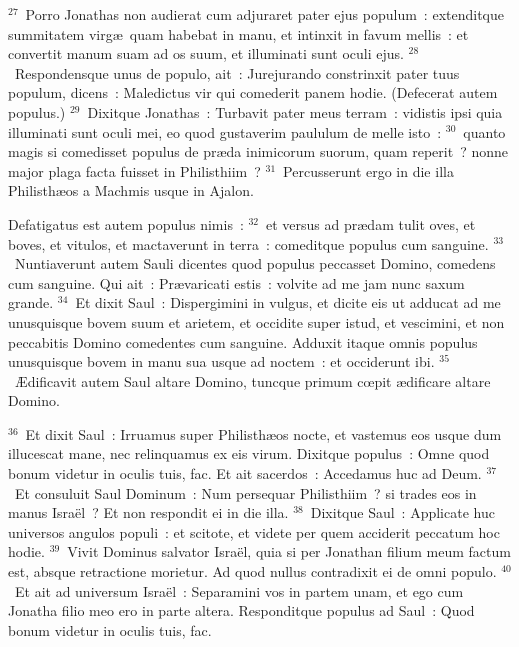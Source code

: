 ${}^{27}$~Porro Jonathas non audierat cum adjuraret pater ejus populum~: extenditque summitatem virg\ae\ quam habebat in manu, et intinxit in favum mellis~: et convertit manum suam ad os suum, et illuminati sunt oculi ejus.
${}^{28}$~Respondensque unus de populo, ait~: Jurejurando constrinxit pater tuus populum, dicens~: Maledictus vir qui comederit panem hodie. (Defecerat autem populus.)
${}^{29}$~Dixitque Jonathas~: Turbavit pater meus terram~: vidistis ipsi quia illuminati sunt oculi mei, eo quod gustaverim paululum de melle isto~:
${}^{30}$~quanto magis si comedisset populus de pr\ae da inimicorum suorum, quam reperit~? nonne major plaga facta fuisset in Philisthiim~?
${}^{31}$~Percusserunt ergo in die illa Philisth\ae os a Machmis usque in Ajalon.

 Defatigatus est autem populus nimis~:
${}^{32}$~et versus ad pr\ae dam tulit oves, et boves, et vitulos, et mactaverunt in terra~: comeditque populus cum sanguine.
${}^{33}$~Nuntiaverunt autem Sauli dicentes quod populus peccasset Domino, comedens cum sanguine. Qui ait~: Pr\ae varicati estis~: volvite ad me jam nunc saxum grande.
${}^{34}$~Et dixit Saul~: Dispergimini in vulgus, et dicite eis ut adducat ad me unusquisque bovem suum et arietem, et occidite super istud, et vescimini, et non peccabitis Domino comedentes cum sanguine. Adduxit itaque omnis populus unusquisque bovem in manu sua usque ad noctem~: et occiderunt ibi.
${}^{35}$~\AE dificavit autem Saul altare Domino, tuncque primum cœpit \ae dificare altare Domino.


${}^{36}$~Et dixit Saul~: Irruamus super Philisth\ae os nocte, et vastemus eos usque dum illucescat mane, nec relinquamus ex eis virum. Dixitque populus~: Omne quod bonum videtur in oculis tuis, fac. Et ait sacerdos~: Accedamus huc ad Deum.
${}^{37}$~Et consuluit Saul Dominum~: Num persequar Philisthiim~? si trades eos in manus Isra\"el~? Et non respondit ei in die illa.
${}^{38}$~Dixitque Saul~: Applicate huc universos angulos populi~: et scitote, et videte per quem acciderit peccatum hoc hodie.
${}^{39}$~Vivit Dominus salvator Isra\"el, quia si per Jonathan filium meum factum est, absque retractione morietur. Ad quod nullus contradixit ei de omni populo.
${}^{40}$~Et ait ad universum Isra\"el~: Separamini vos in partem unam, et ego cum Jonatha filio meo ero in parte altera. Responditque populus ad Saul~: Quod bonum videtur in oculis tuis, fac.


